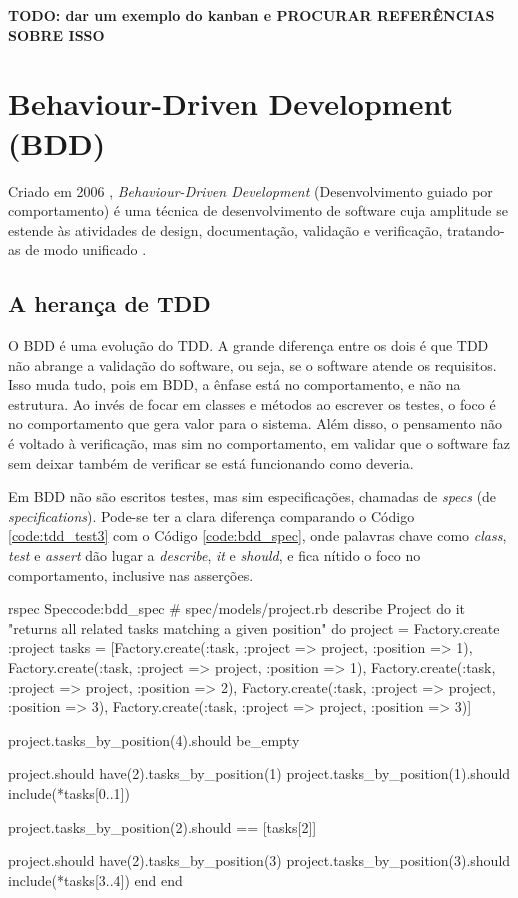 \textbf{TODO: dar um exemplo do kanban e PROCURAR REFERÊNCIAS SOBRE ISSO}



\section{Behaviour-Driven Development (BDD)}
\label{sec:bdd}

Criado em 2006 \cite{IntroducingBDD}, \textit{Behaviour-Driven Development} (Desenvolvimento guiado por comportamento) é uma técnica de desenvolvimento de software cuja amplitude se estende às atividades de design, documentação, validação e verificação, tratando-as de modo unificado \cite{BDDRodrigo}.

\subsection{A herança de TDD}
\label{sub:a_heranca_de_tdd}

O BDD é uma evolução do TDD. A grande diferença entre os dois é que TDD não abrange a validação do software, ou seja, se o software atende os requisitos. Isso muda tudo, pois em BDD, a ênfase está no comportamento, e não na estrutura. Ao invés de focar em classes e métodos ao escrever os testes, o foco é no comportamento que gera valor para o sistema. Além disso, o pensamento não é voltado à verificação, mas sim no comportamento, em validar que o software faz sem deixar também de verificar se está funcionando como deveria.

Em BDD não são escritos testes, mas sim especificações, chamadas de \textit{specs} (de \textit{specifications}). Pode-se ter a clara diferença comparando o Código \ref{code:tdd_test3} com o Código \ref{code:bdd_spec}, onde palavras chave como \textit{class}, \textit{test} e \textit{assert} dão lugar a \textit{describe}, \textit{it} e \textit{should}, e fica nítido o foco no comportamento, inclusive nas asserções.

\begin{mycode}{rspec}%
{Spec}{code:bdd_spec}
# spec/models/project.rb
describe Project do
  it "returns all related tasks matching a given position" do
    project = Factory.create :project
    tasks = [Factory.create(:task, :project => project, :position => 1),
             Factory.create(:task, :project => project, :position => 1),
             Factory.create(:task, :project => project, :position => 2),
             Factory.create(:task, :project => project, :position => 3),
             Factory.create(:task, :project => project, :position => 3)]

    project.tasks_by_position(4).should be_empty

    project.should have(2).tasks_by_position(1)
    project.tasks_by_position(1).should include(*tasks[0..1])

    project.tasks_by_position(2).should == [tasks[2]]

    project.should have(2).tasks_by_position(3)
    project.tasks_by_position(3).should include(*tasks[3..4])
  end
end
\end{mycode}

